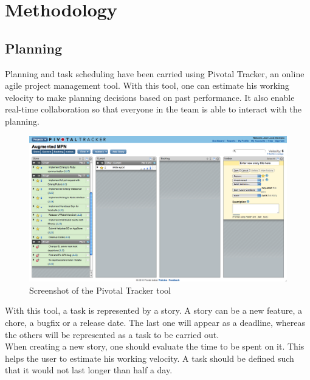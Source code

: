 \chapter{Methodology}
\label{cha:methodology}

\section{Planning}

Planning and task scheduling have been carried using Pivotal Tracker, an online agile project management tool. With this tool, one can estimate his working velocity to make planning decisions based on past performance. It also enable real-time collaboration so that everyone in the team is able to interact with the planning.\\

\begin{figure}[ht]
\center
\includegraphics[scale=0.3]{pics/pivotal_tracker}
\caption{Screenshot of the Pivotal Tracker tool}
\label{fig:pivotal_tracker}
\end{figure}

With this tool, a task is represented by a story. A story can be a new feature, a chore, a bugfix or a release date. The last one will appear as a deadline, whereas the others will be represented as a task to be carried out.\\

When creating a new story, one should evaluate the time to be spent on it. This helps the user to estimate his working velocity. A task should be defined such that it would not last longer than half a day.\\

